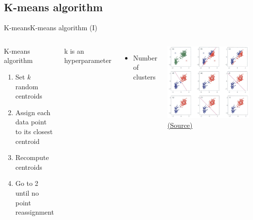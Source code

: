 \documentclass[10pt,compress]{beamer} %
\begin{document}
\subsection{K-means algorithm}
\begin{frame}{K-means}{K-means algorithm (I)}
    \begin{columns}
       \begin{block}{K-means algorithm}
       \begin{enumerate}
        \item Set $k$ random centroids
        \item Assign each data point to its closest centroid
        \item Recompute centroids
        \item Go to 2 until no point reassignment
       \end{enumerate}
       \end{block}

       k is an hyperparameter
       \begin{itemize}
        \item Number of clusters
       \end{itemize}

		\includegraphics[width=\textwidth]{figs/kmeans.jpeg}\\

    \centering \tiny{\href{https://dendroid.sk/2011/05/09/k-means-clustering/}{(Source)}}
    \end{columns}

\end{frame}
\end{document}
